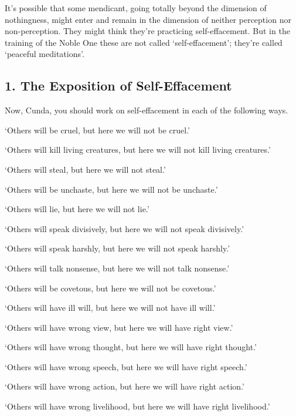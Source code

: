 \documentclass[12pt,openany]{book}%
\begin{document}
It’s possible that some mendicant, going totally beyond the dimension of nothingness, might enter and remain in the dimension of neither perception nor non-perception. They might think they’re practicing self-effacement. But in the training of the Noble One these are not called ‘self-effacement’; they’re called ‘peaceful meditations’. 

\subsection*{1. The Exposition of Self-Effacement }

Now, Cunda, you should work on self-effacement in each of the following ways. 

‘Others will be cruel, but here we will not be cruel.’ 

‘Others will kill living creatures, but here we will not kill living creatures.’ 

‘Others will steal, but here we will not steal.’ 

‘Others will be unchaste, but here we will not be unchaste.’ 

‘Others will lie, but here we will not lie.’ 

‘Others will speak divisively, but here we will not speak divisively.’ 

‘Others will speak harshly, but here we will not speak harshly.’ 

‘Others will talk nonsense, but here we will not talk nonsense.’ 

‘Others will be covetous, but here we will not be covetous.’ 

‘Others will have ill will, but here we will not have ill will.’ 

‘Others will have wrong view, but here we will have right view.’ 

‘Others will have wrong thought, but here we will have right thought.’ 

‘Others will have wrong speech, but here we will have right speech.’ 

‘Others will have wrong action, but here we will have right action.’ 

‘Others will have wrong livelihood, but here we will have right livelihood.’ 
\end{document}
